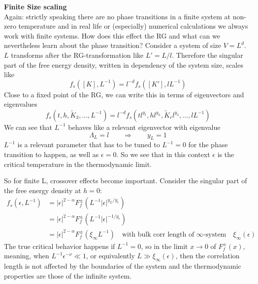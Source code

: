 	\textbf{Finite Size scaling}\\
	Again: strictly speaking there are no phase transitions in a finite system at non-zero temperature and in real life or (especially) numerical calculations we always work with finite systems. How does this effect the RG and what can we nevertheless learn about the phase transition? Consider a system of size $V = L^d$. $L$ transforms after the RG-transformation like $L' = L/l$. Therefore the singular part of the free energy density, written in dependency of the system size, scales like
	\begin{equation}
		f_s([K], L^{-1}) =	l^{-d} f_s([K'], l L^{-1})
	\end{equation}
	Close to a fixed point of the RG, we can write this in terms of eigenvectors and eigenvalues
	\begin{equation}
		f_s(t, h, \tilde{K}_3, ..., L^{-1}) =	l^{-d} f_s(t l^{y_t}, h l^{y_h}, \tilde{K}_r l^{y_3}, ..., l L^{-1})
	\end{equation}
	We can see that $L^{-1}$ behaves like a relevant eigenvector with eigenvalue
	\begin{equation}
		\Lambda_L =	l \qquad \Rightarrow \qquad y_L = 1
	\end{equation}
	$L^{-1}$ is a relevant parameter that has to be tuned to $L^{-1} = 0$ for the phase transition to happen, as well as $\epsilon = 0$. So we see that in this context $\epsilon$ is the critical temperature in the thermodynamic limit.
	
	So for finite L, crossover effects become important. Consider the singular part of the free energy density at $h=0$:
	\begin{align}
		f_s(\epsilon, L^{-1}) &= |\epsilon|^{2 - \alpha} F_f^\pm(L^{-1} |\epsilon|^{y_L / y_\epsilon}) \\
		&= |\epsilon|^{2 - \alpha} F_f^\pm(L^{-1} |\epsilon|^{-1 / y_\epsilon}) \\
		&=	|\epsilon|^{2 - \alpha} F_f^\pm(\xi_\infty L^{-1}) \quad \text{with bulk corr length of  $\infty$-system} \quad \xi_\infty(\epsilon)
	\end{align}
	The true critical behavior happens if $L^{-1} = 0$, so in the limit $x \rightarrow 0$ of $F_f^\pm(x)$, meaning, when $L^{-1}\epsilon^{-\nu} \ll 1$, or equivalently $L \gg \xi_\infty(\epsilon)$, then the correlation length is not affected by the boundaries of the system and the thermodynamic properties are those of the infinite system.
	

